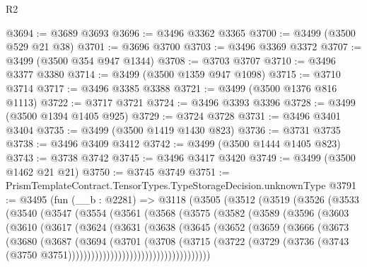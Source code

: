 \begin{lexlean}{R2}
\begin{coremodule}
@3694 := @3689 @3693
@3696 := @3496 @3362 @3365
@3700 := @3499 (@3500 @529 @21 @38)
@3701 := @3696 @3700
@3703 := @3496 @3369 @3372
@3707 := @3499 (@3500 @354 @947 @1344)
@3708 := @3703 @3707
@3710 := @3496 @3377 @3380
@3714 := @3499 (@3500 @1359 @947 @1098)
@3715 := @3710 @3714
@3717 := @3496 @3385 @3388
@3721 := @3499 (@3500 @1376 @816 @1113)
@3722 := @3717 @3721
@3724 := @3496 @3393 @3396
@3728 := @3499 (@3500 @1394 @1405 @925)
@3729 := @3724 @3728
@3731 := @3496 @3401 @3404
@3735 := @3499 (@3500 @1419 @1430 @823)
@3736 := @3731 @3735
@3738 := @3496 @3409 @3412
@3742 := @3499 (@3500 @1444 @1405 @823)
@3743 := @3738 @3742
@3745 := @3496 @3417 @3420
@3749 := @3499 (@3500 @1462 @21 @21)
@3750 := @3745 @3749
@3751 := PrismTemplateContract.TensorTypes.TypeStorageDecision.unknownType
@3791 := @3495
    (fun (__b : @2281) =>
    @3118
      (@3505
        (@3512
          (@3519
            (@3526
              (@3533
                (@3540
                  (@3547
                    (@3554
                      (@3561
                        (@3568
                          (@3575
                            (@3582
                              (@3589
                                (@3596
                                  (@3603
                                    (@3610
                                      (@3617
                                        (@3624
                                          (@3631
                                            (@3638
                                              (@3645
                                                (@3652
                                                  (@3659
                                                    (@3666
                                                      (@3673
                                                        (@3680
                                                          (@3687
                                                            (@3694
                                                              (@3701
                                                                (@3708
                                                                  (@3715
                                                                    (@3722
                                                                      (@3729
                                                                        (@3736
                                                                          (@3743
                                                                            (@3750
                                                                              @3751)))))))))))))))))))))))))))))))))))))

\end{coremodule}
\end{lexlean}
